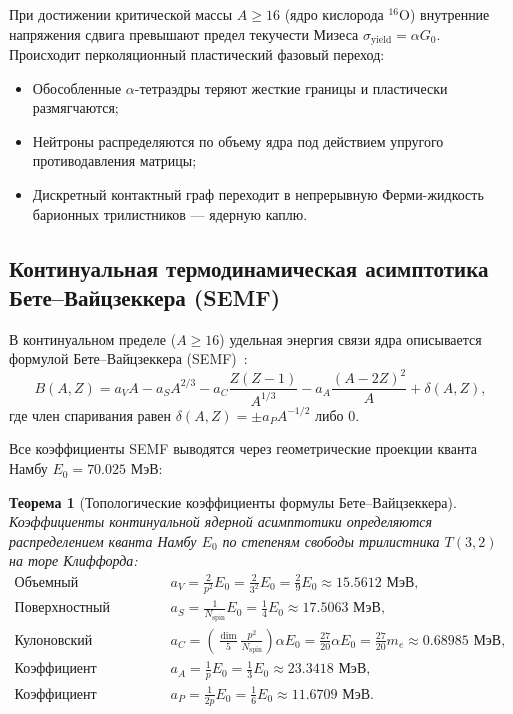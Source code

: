 \documentclass[11pt,a4paper]{article}
\newtheorem{theorem}{Теорема}
\theoremstyle{definition}
\theoremstyle{remark}
\begin{document}
При достижении критической массы $A \ge 16$ (ядро кислорода $^{16}\mathrm{O}$) внутренние напряжения сдвига превышают предел текучести Мизеса $\sigma_{\mathrm{yield}} = \alpha G_0$. Происходит перколяционный пластический фазовый переход:
\begin{itemize}
	\item Обособленные $\alpha$-тетраэдры теряют жесткие границы и пластически размягчаются;
	\item Нейтроны распределяются по объему ядра под действием упругого противодавления матрицы;
	\item Дискретный контактный граф переходит в непрерывную Ферми-жидкость барионных трилистников — ядерную каплю.
\end{itemize}

\subsection{Континуальная термодинамическая асимптотика Бете--Вайцзеккера (SEMF)}

В континуальном пределе ($A \ge 16$) удельная энергия связи ядра описывается формулой Бете--Вайцзеккера (SEMF)~\cite{Weizsacker1935,BetheBacher1936}:
\begin{equation}
	B(A, Z) = a_V A - a_S A^{2/3} - a_C \frac{Z(Z-1)}{A^{1/3}} - a_A \frac{(A - 2Z)^2}{A} + \delta(A, Z),
\label{eq:semf_formula}
\end{equation}
где член спаривания равен $\delta(A, Z) = \pm a_P A^{-1/2}$ либо $0$.

Все коэффициенты SEMF выводятся через геометрические проекции кванта Намбу $E_0 = 70.025\text{ МэВ}$:

\begin{theorem}[Топологические коэффициенты формулы Бете--Вайцзеккера]
\label{thm:semf_coefficients_derivation}
Коэффициенты континуальной ядерной асимптотики определяются распределением кванта Намбу $E_0$ по степеням свободы трилистника $T(3,2)$ на торе Клиффорда:
\begin{align}
	\text{Объемный коэффициент:} \quad & a_V = \frac{2}{p^2} E_0 = \frac{2}{3^2} E_0 = \frac{2}{9} E_0 \approx 15.5612\text{ МэВ}, \label{eq:semf_aV} \\
	\text{Поверхностный коэффициент:} \quad & a_S = \frac{1}{N_{\mathrm{spin}}} E_0 = \frac{1}{4} E_0 \approx 17.5063\text{ МэВ}, \label{eq:semf_aS} \\
	\text{Кулоновский коэффициент:} \quad & a_C = \left(\frac{\dim}{5} \frac{p^2}{N_{\mathrm{spin}}}\right) \alpha E_0 = \frac{27}{20} \alpha E_0 = \frac{27}{20} m_e \approx 0.68985\text{ МэВ}, \label{eq:semf_aC} \\
	\text{Коэффициент асимметрии:} \quad & a_A = \frac{1}{p} E_0 = \frac{1}{3} E_0 \approx 23.3418\text{ МэВ}, \label{eq:semf_aA} \\
	\text{Коэффициент спаривания:} \quad & a_P = \frac{1}{2p} E_0 = \frac{1}{6} E_0 \approx 11.6709\text{ МэВ}. \label{eq:semf_aP}
\end{align}
\end{theorem}
\end{document}

